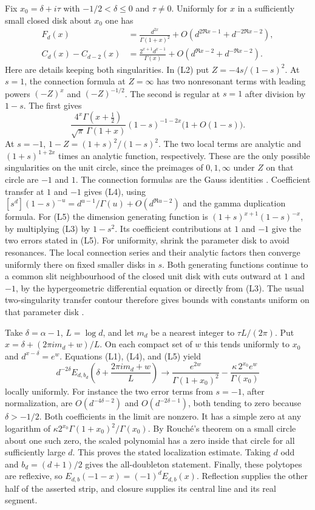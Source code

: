 \documentclass[11pt,a4paper]{article}
\theoremstyle{definition}\newtheorem{problem}[theorem]{Problem}
\begin{document}
Fix $x_0=\delta+i\tau$ with $-1/2<\delta\le0$ and $\tau\ne0$. Uniformly for $x$ in a sufficiently small closed disk about $x_0$ one has
\begin{align}
 F_d(x)&=\frac{d^{2x}}{\Gamma(1+x)^2}
 +O\!\left(d^{2\Re x-1}+d^{-2\Re x-2}\right),\tag{L4}\\
 C_d(x)-C_{d-2}(x)&=\frac{2^{x+1}d^{x-1}}{\Gamma(x)}
 +O\!\left(d^{\Re x-2}+d^{-\Re x-2}\right).\tag{L5}
\end{align}
Here are details keeping both singularities. In (L2) put $Z=-4s/(1-s)^2$. At $s=1$, the connection formula at $Z=\infty$ has two nonresonant terms with leading powers $(-Z)^x$ and $(-Z)^{-1/2}$. The second is regular at $s=1$ after division by $1-s$. The first gives
\[
 \frac{4^x\Gamma(x+\tfrac12)}{\sqrt\pi\,\Gamma(1+x)}
 (1-s)^{-1-2x}\bigl(1+O(1-s)\bigr).
\]
At $s=-1$, $1-Z=(1+s)^2/(1-s)^2$. The two local terms are analytic and $(1+s)^{1+2x}$ times an analytic function, respectively. These are the only possible singularities on the unit circle, since the preimages of $0,1,\infty$ under $Z$ on that circle are $-1$ and $1$. The connection formulas are the Gauss identities \cite[equations 15.8.2 and 15.8.4]{DLMF}. Coefficient transfer at $1$ and $-1$ gives (L4), using $[s^d](1-s)^{-u}=d^{u-1}/\Gamma(u)+O(d^{\Re u-2})$ and the gamma duplication formula. For (L5) the dimension generating function is $(1+s)^{x+1}(1-s)^{-x}$, by multiplying (L3) by $1-s^2$. Its coefficient contributions at $1$ and $-1$ give the two errors stated in (L5). For uniformity, shrink the parameter disk to avoid resonances. The local connection series and their analytic factors then converge uniformly there on fixed smaller disks in $s$. Both generating functions continue to a common slit neighbourhood of the closed unit disk with cuts outward at $1$ and $-1$, by the hypergeometric differential equation or directly from (L3). The usual two-singularity transfer contour therefore gives bounds with constants uniform on that parameter disk \cite[Theorem~VI.5]{FS}.

Take $\delta=\alpha-1$, $L=\log d$, and let $m_d$ be a nearest integer to $\tau L/(2\pi)$. Put $x=\delta+(2\pi i m_d+w)/L$. On each compact set of $w$ this tends uniformly to $x_0$ and $d^{x-\delta}=e^w$. Equations (L1), (L4), and (L5) yield
\[
 d^{-2\delta}E_{d,b_d}\!\left(\delta+\frac{2\pi i m_d+w}{L}\right)
 \longrightarrow
 \frac{e^{2w}}{\Gamma(1+x_0)^2}
 -\frac{\kappa\,2^{x_0} e^w}{\Gamma(x_0)}
\]
locally uniformly. For instance the two error terms from $s=-1$, after normalization, are $O(d^{-4\delta-2})$ and $O(d^{-2\delta-1})$, both tending to zero because $\delta>-1/2$. Both coefficients in the limit are nonzero. It has a simple zero at any logarithm of $\kappa 2^{x_0}\Gamma(1+x_0)^2/\Gamma(x_0)$. By Rouch\'e's theorem on a small circle about one such zero, the scaled polynomial has a zero inside that circle for all sufficiently large $d$. This proves the stated localization estimate. Taking $d$ odd and $b_d=(d+1)/2$ gives the all-doubleton statement. Finally, these polytopes are reflexive, so $E_{d,b}(-1-x)=(-1)^d E_{d,b}(x)$. Reflection supplies the other half of the asserted strip, and closure supplies its central line and its real segment.
\end{document}
